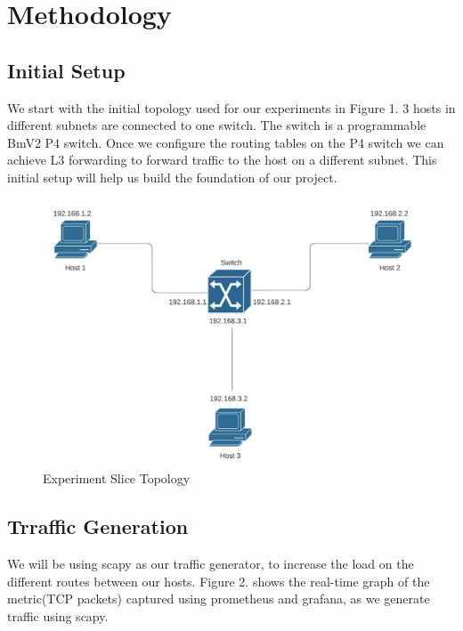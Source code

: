 \documentclass[conference]{IEEEtran}
\begin{document}
    \section{Methodology}

    \subsection{Initial Setup}
    We start with the initial topology used for our experiments in Figure 1. 3 hosts in different subnets are connected to one switch. The switch is a programmable BmV2 P4 switch. Once we configure the routing tables on the P4 switch we can achieve L3 forwarding to forward traffic to the host on a different subnet. This initial setup will help us build the foundation of our project.

    \begin{figure}[h!]
        \includegraphics[scale=0.2]{Initial Switch topology.png}
        \centering
        \caption{Experiment Slice Topology}
    \end{figure}

    \subsection{Trraffic Generation}
    We will be using scapy as our traffic generator, to increase the load on the different routes between our hosts. Figure 2. shows the real-time graph of the metric(TCP packets) captured using prometheus and grafana, as we generate traffic using scapy.
\end{document}
